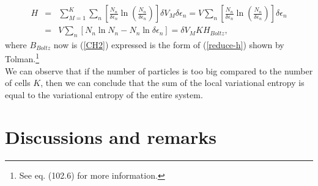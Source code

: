 \documentclass{article}
\newcommand{\de}{\delta}
\begin{document}
\begin{eqnarray}
    H&=& \sum_{M=1}^{K} \sum_n
    \left[  
           \frac{N_{n}}{ \delta \epsilon_{n}} \ln 
           \left( 
                  \frac{N_{n}}{ \delta \epsilon_{n}}
           \right)
    \right]  \de V_M \delta \epsilon_{n} = V \sum_n
    \left[  
           \frac{N_{n}}{ \delta \epsilon_{n}} \ln 
           \left( 
                  \frac{N_{n}}{ \delta \epsilon_{n}}
           \right)
    \right] \delta \epsilon_{n} \nonumber \\
    &=& V \sum_n \left[N_n \ln N_n - N_n \ln \delta \epsilon_n  \right]=\de V_M K H_{Boltz},\label{h-quantic4}
\end{eqnarray}
where $B_{Boltz}$ now is (\ref{CH2}) expressed is the form of (\ref{reduce-h}) shown by Tolman.\footnote{See \cite{tolman} eq. (102.6) for more information.}\\
We can observe that if the number of particles is too big compared to the number of cells $K$, then we can conclude that the sum of the local variational entropy is equal to the variational entropy of the entire system.


\section{Discussions and remarks}
\end{document}
